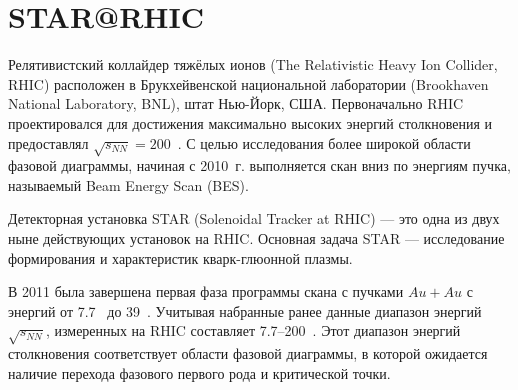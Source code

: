 

\section{STAR@RHIC}


Релятивистский коллайдер тяжёлых ионов (The Relativistic Heavy Ion Collider, RHIC) расположен в Брукхейвенской национальной лаборатории (Brookhaven National Laboratory, BNL), штат Нью-Йорк, США. Первоначально RHIC проектировался для достижения максимально высоких энергий столкновения и предоставлял $\sqrt{s_{NN}}=200$~\GeVperNucl. С целью исследования более широкой области фазовой диаграммы, начиная с 2010~г. выполняется скан вниз по энергиям пучка, называемый Beam Energy Scan (BES).

Детекторная установка STAR (Solenoidal Tracker at RHIC) --- это одна из двух ныне действующих установок на RHIC. Основная задача STAR --- исследование формирования и характеристик кварк-глюонной плазмы.



В 2011 была завершена первая фаза программы скана с пучками $Au+Au$ с энергий от 7.7~\GeVperNucl{} до 39~\GeVperNucl. Учитывая набранные ранее данные диапазон энергий $\sqrt{s_{NN}}$, измеренных на RHIC составляет 7.7--200~\GeVperNucl. Этот диапазон энергий столкновения соответствует области фазовой диаграммы, в которой ожидается наличие перехода фазового первого рода и критической точки.

